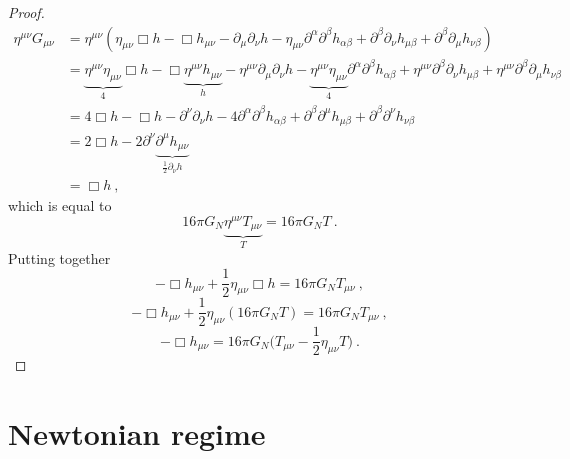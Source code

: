\begin{proof}
\begin{equation*}
\begin{aligned}
            \eta^{\mu\nu} G_{\mu\nu} & = \eta^{\mu\nu} (\eta_{\mu\nu} \Box h - \Box h_{\mu\nu} - \partial_\mu \partial_\nu h - \eta_{\mu\nu} \partial^\alpha \partial^\beta h_{\alpha\beta} + \partial^\beta \partial_\nu h_{\mu\beta} + \partial^\beta \partial_\mu h_{\nu\beta}) \\ & = \underbrace{\eta^{\mu\nu}\eta_{\mu\nu}}_4 \Box h - \Box \underbrace{\eta^{\mu\nu} h_{\mu\nu}}_h - \eta^{\mu\nu}\partial_\mu \partial_\nu h - \underbrace{\eta^{\mu\nu} \eta_{\mu\nu}}_4 \partial^\alpha \partial^\beta h_{\alpha\beta} + \eta^{\mu\nu} \partial^\beta \partial_\nu h_{\mu\beta} + \eta^{\mu\nu} \partial^\beta \partial_\mu h_{\nu\beta} \\ & = 4 \Box h - \Box h - \partial^\nu \partial_\nu h - 4 \partial^\alpha \partial^\beta h_{\alpha\beta} + \partial^\beta \partial^\mu h_{\mu\beta} + \partial^\beta \partial^\nu h_{\nu\beta} \\ & = 2 \Box h - 2 \partial^\nu \underbrace{\partial^\mu h_{\mu\nu}}_{\frac{1}{2} \partial_\nu h} \\ & = \Box h ~,
        \end{aligned}
        \end{equation*}
        which is equal to 
        \begin{equation*}
            16 \pi G_N \underbrace{\eta^{\mu\nu} T_{\mu\nu}}_T = 16 \pi G_N T ~.
        \end{equation*}
        Putting together
        \begin{equation*}
            - \Box h_{\mu\nu} + \frac{1}{2} \eta_{\mu\nu} \Box h = 16 \pi G_N T_{\mu\nu} ~,
        \end{equation*}
        \begin{equation*}
            - \Box h_{\mu\nu} + \frac{1}{2} \eta_{\mu\nu} (16 \pi G_N T) = 16 \pi G_N T_{\mu\nu} ~,
        \end{equation*}
        \begin{equation*}
            - \Box h_{\mu\nu} = 16 \pi G_N \Big ( T_{\mu\nu} - \frac{1}{2} \eta_{\mu\nu} T) ~.
        \end{equation*}
    \end{proof}

\section{Newtonian regime}

